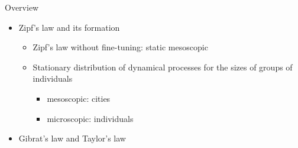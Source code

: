 \begin{frame}{Overview}
    \begin{itemize}
      \item Zipf's law and its formation
      \begin{itemize}
        \item Zipf's law without fine-tuning: static mesoscopic
        \item Stationary distribution of dynamical processes for the sizes of groups of individuals
        \begin{itemize}
          \item mesoscopic: cities
          \item microscopic: individuals
        \end{itemize}
      \end{itemize}
      \item Gibrat's law and Taylor's law
    \end{itemize}
\end{frame}
